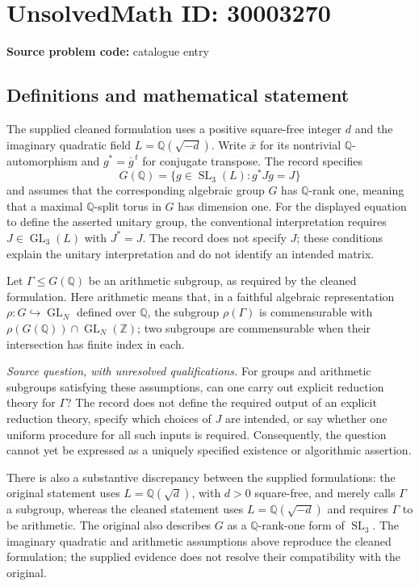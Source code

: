\documentclass[11pt]{article}
\newcommand{\Z}{\mathbb{Z}}
\newcommand{\Q}{\mathbb{Q}}
\begin{document}
\section*{UnsolvedMath ID: 30003270}
\textbf{Source problem code:} catalogue entry
\subsection{Definitions and mathematical statement}
The supplied cleaned formulation uses a positive square-free integer \(d\) and the imaginary quadratic field \(L=\Q(\sqrt{-d})\). Write \(\overline{x}\) for its nontrivial \(\Q\)-automorphism and \(g^*=\overline{g}^{\,t}\) for conjugate transpose. The record specifies
\[
G(\Q)=\{g\in\operatorname{SL}_3(L):g^*Jg=J\}
\]
and assumes that the corresponding algebraic group \(G\) has \(\Q\)-rank one, meaning that a maximal \(\Q\)-split torus in \(G\) has dimension one. For the displayed equation to define the asserted unitary group, the conventional interpretation requires \(J\in\operatorname{GL}_3(L)\) with \(J^*=J\). The record does not specify \(J\); these conditions explain the unitary interpretation and do not identify an intended matrix.

Let \(\Gamma\leq G(\Q)\) be an arithmetic subgroup, as required by the cleaned formulation. Here arithmetic means that, in a faithful algebraic representation \(\rho:G\hookrightarrow\operatorname{GL}_N\) defined over \(\Q\), the subgroup \(\rho(\Gamma)\) is commensurable with \(\rho(G(\Q))\cap\operatorname{GL}_N(\Z)\); two subgroups are commensurable when their intersection has finite index in each.

\emph{Source question, with unresolved qualifications.} For groups and arithmetic subgroups satisfying these assumptions, can one carry out explicit reduction theory for \(\Gamma\)? The record does not define the required output of an explicit reduction theory, specify which choices of \(J\) are intended, or say whether one uniform procedure for all such inputs is required. Consequently, the question cannot yet be expressed as a uniquely specified existence or algorithmic assertion.

There is also a substantive discrepancy between the supplied formulations: the original statement uses \(L=\Q(\sqrt d)\), with \(d>0\) square-free, and merely calls \(\Gamma\) a subgroup, whereas the cleaned statement uses \(L=\Q(\sqrt{-d})\) and requires \(\Gamma\) to be arithmetic. The original also describes \(G\) as a \(\Q\)-rank-one form of \(\operatorname{SL}_3\). The imaginary quadratic and arithmetic assumptions above reproduce the cleaned formulation; the supplied evidence does not resolve their compatibility with the original.
\end{document}
